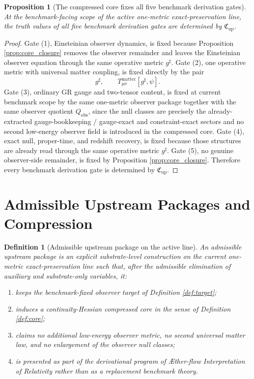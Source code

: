 \documentclass[11pt]{article}
\newcommand{\Aflow}{\AE{}ther-flow}
\newcommand{\TheoryName}{\Aflow{} Interpretation of Relativity}
\newcommand{\CompletedMetric}{g^{\sharp}}
\newcommand{\CompressionData}{\mathfrak C_{\mathrm{up}}}
\newcommand{\ObserverQuotient}{Q_{\mathrm{obs}}}
\newtheorem{definition}{Definition}
\newtheorem{proposition}{Proposition}
\begin{document}
\begin{proposition}[The compressed core fixes all five benchmark derivation gates]
\label{prop:gates}
At the benchmark-facing scope of the active one-metric exact-preservation line, the truth values of all five benchmark derivation gates are determined by \(\CompressionData\).
\end{proposition}

\begin{proof}
Gate (1), Einsteinian observer dynamics, is fixed because Proposition \ref{prop:core_closure} removes the observer remainder and leaves the Einsteinian observer equation through the same operative metric \(\CompletedMetric\). Gate (2), one operative metric with universal matter coupling, is fixed directly by the pair
\[
\CompletedMetric,\qquad
T_{\mu\nu}^{\mathrm{matter}}[\CompletedMetric,\psi].
\]
Gate (3), ordinary GR gauge and two-tensor content, is fixed at current benchmark scope by the same one-metric observer package together with the same observer quotient \(\ObserverQuotient\), since the null classes are precisely the already-extracted gauge-bookkeeping / gauge-exact and constraint-exact sectors and no second low-energy observer field is introduced in the compressed core. Gate (4), exact null, proper-time, and redshift recovery, is fixed because those structures are already read through the same operative metric \(\CompletedMetric\). Gate (5), no genuine observer-side remainder, is fixed by Proposition \ref{prop:core_closure}. Therefore every benchmark derivation gate is determined by \(\CompressionData\).
\end{proof}

\section{Admissible Upstream Packages and Compression}

\begin{definition}[Admissible upstream package on the active line]
\label{def:admissible}
An \emph{admissible upstream package} is an explicit substrate-level construction on the current one-metric exact-preservation line such that, after the admissible elimination of auxiliary and substrate-only variables, it:
\begin{enumerate}
    \item keeps the benchmark-fixed observer target of Definition \ref{def:target};
    \item induces a continuity-Hessian compressed core in the sense of Definition \ref{def:core};
    \item claims no additional low-energy observer metric, no second universal matter law, and no enlargement of the observer null classes;
    \item is presented as part of the derivational program of \TheoryName{} rather than as a replacement benchmark theory.
\end{enumerate}
\end{definition}
\end{document}
